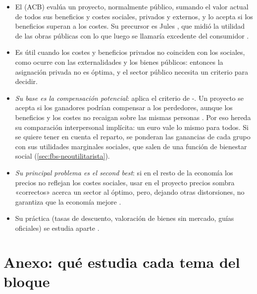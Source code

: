 \documentclass[11pt]{article}
\begin{document}
\begin{itemize}
\item El  (ACB) evalúa un proyecto, normalmente público, sumando el valor actual de todos sus beneficios y costes sociales, privados y externos, y lo acepta si los beneficios superan a los costes. Su precursor es Jules \textcite{Dupuit1844Mesure}, que midió la utilidad de las obras públicas con lo que luego se llamaría excedente del consumidor .
\item Es útil cuando los costes y beneficios privados no coinciden con los sociales, como ocurre con las externalidades y los bienes públicos: entonces la asignación privada no es óptima, y el sector público necesita un criterio para decidir.
\item \emph{Su base es la compensación potencial}: aplica el criterio de -. Un proyecto se acepta si los ganadores podrían compensar a los perdedores, aunque los beneficios y los costes no recaigan sobre las mismas personas . Por eso hereda su comparación interpersonal implícita: un euro vale lo mismo para todos. Si se quiere tener en cuenta el reparto, se ponderan las ganancias de cada grupo con sus utilidades marginales sociales, que salen de una función de bienestar social (\ref{sec:fbs-neoutilitarista}).
\item \emph{Su principal problema es el second best}: si en el resto de la economía los precios no reflejan los costes sociales, usar en el proyecto precios sombra «correctos» acerca un sector al óptimo, pero, dejando otras distorsiones, no garantiza que la economía mejore\nocite{LipseyLancaster1956General} .
\item Su práctica (tasas de descuento, valoración de bienes sin mercado, guías oficiales) se estudia aparte .
\end{itemize}

\section{Anexo: qué estudia cada tema del bloque}\label{anexo:bloque}
\end{document}
